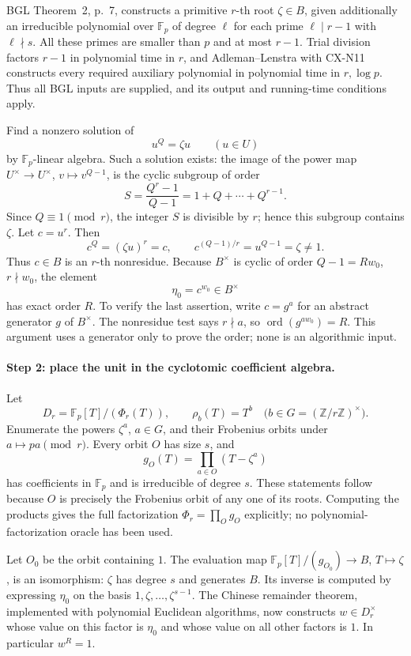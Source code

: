 BGL Theorem~2, p.~7, constructs a primitive \(r\)-th root
\(\zeta\in B\), given additionally an irreducible polynomial
over \(\mathbb F_p\) of degree \(\ell\) for each prime
\(\ell\mid r-1\) with \(\ell\nmid s\).
All these primes are smaller than \(p\) and at most \(r-1\).
Trial division factors \(r-1\) in polynomial time in \(r\),
and Adleman--Lenstra with CX-N11 constructs every required
auxiliary polynomial in polynomial time in \(r,\log p\).
Thus all BGL inputs are supplied, and its output and running-time
conditions apply.

Find a nonzero solution of
\[
 u^Q=\zeta u\qquad (u\in U)
\]
by \(\mathbb F_p\)-linear algebra.
Such a solution exists: the image of the power map
\(U^\times\to U^\times\), \(v\mapsto v^{Q-1}\), is the
cyclic subgroup of order
\[
 S=\frac{Q^r-1}{Q-1}=1+Q+\cdots+Q^{r-1}.
\]
Since \(Q\equiv1\pmod r\), the integer \(S\) is divisible
by \(r\); hence this subgroup contains \(\zeta\).
Let \(c=u^r\). Then
\[
 c^Q=(\zeta u)^r=c,
 \qquad c^{(Q-1)/r}=u^{Q-1}=\zeta\ne1.
\]
Thus \(c\in B\) is an \(r\)-th nonresidue.
Because \(B^\times\) is cyclic of order \(Q-1=R w_0\),
\(r\nmid w_0\), the element
\[
 \eta_0=c^{w_0}\in B^\times
\]
has exact order \(R\).
To verify the last assertion, write \(c=g^a\) for an abstract
generator \(g\) of \(B^\times\).
The nonresidue test says \(r\nmid a\), so
\(\operatorname{ord}(g^{a w_0})=R\).
This argument uses a generator only to prove the order; none is
an algorithmic input.

\paragraph{Step 2: place the unit in the cyclotomic coefficient algebra.}
Let
\[
 D_r=\mathbb F_p[T]/(\Phi_r(T)),\qquad
 \rho_b(T)=T^b\quad\bigl(b\in G=(\mathbb Z/r\mathbb Z)^\times\bigr).
\]
Enumerate the powers \(\zeta^a\), \(a\in G\), and their
Frobenius orbits under \(a\mapsto pa\pmod r\).
Every orbit \(O\) has size \(s\), and
\[
 g_O(T)=\prod_{a\in O}(T-\zeta^a)
\]
has coefficients in \(\mathbb F_p\) and is irreducible of
degree \(s\).
These statements follow because \(O\) is precisely the
Frobenius orbit of any one of its roots.
Computing the products gives the full factorization
\(\Phi_r=\prod_Og_O\) explicitly; no polynomial-factorization
oracle has been used.

Let \(O_0\) be the orbit containing \(1\).
The evaluation map
\(\mathbb F_p[T]/(g_{O_0})\to B\), \(T\mapsto\zeta\), is
an isomorphism: \(\zeta\) has degree \(s\) and generates \(B\).
Its inverse is computed by expressing \(\eta_0\) on the basis
\(1,\zeta,\ldots,\zeta^{s-1}\).
The Chinese remainder theorem, implemented with polynomial
Euclidean algorithms, now constructs \(w\in D_r^\times\)
whose value on this factor is \(\eta_0\) and whose value on
all other factors is \(1\).
In particular \(w^R=1\).

